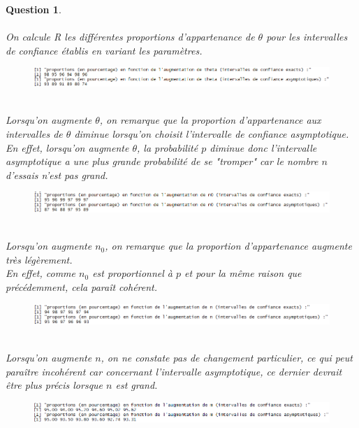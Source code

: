 \documentclass[a4paper,11pt]{article}
\newtheorem{exo4}{Question}
\begin{document}
\begin{exo4} \ \\ \\
On calcule R les différentes proportions d'appartenance de $\theta$ pour les intervalles de confiance établis en variant les paramètres.
\begin{figure}[h]
\includegraphics[scale=0.85]{images/Q4_1_theta.PNG}
\end{figure} \ \\
Lorsqu'on augmente $\theta$, on remarque que la proportion d'appartenance aux intervalles de $\theta$ diminue lorsqu'on choisit l'intervalle de confiance asymptotique. \ \\
En effet, lorsqu'on augmente $\theta$, la probabilité $p$ diminue donc l'intervalle asymptotique a une plus grande probabilité de se "tromper" car le nombre $n$ d'essais n'est pas grand.
\begin{figure}[h]
\includegraphics[scale=0.85]{images/Q4_1_n0.PNG}
\end{figure} \ \\
Lorsqu'on augmente $n_{0}$, on remarque que la proportion d'appartenance augmente très légèrement. \ \\
En effet, comme $n_{0}$ est proportionnel à $p$ et pour la même raison que précédemment, cela paraît cohérent.
\begin{figure}[h]
\includegraphics[scale=0.85]{images/Q4_1_n.PNG}
\end{figure} \ \\
Lorsqu'on augmente $n$, on ne constate pas de changement particulier, ce qui peut paraître incohérent car concernant l'intervalle asymptotique, ce dernier devrait être plus précis lorsque $n$ est grand.
\newpage
\begin{figure}[h]
\includegraphics[scale=0.85]{images/Q4_1_m.PNG}
\end{figure} \ \\

\end{exo4}
\end{document}
